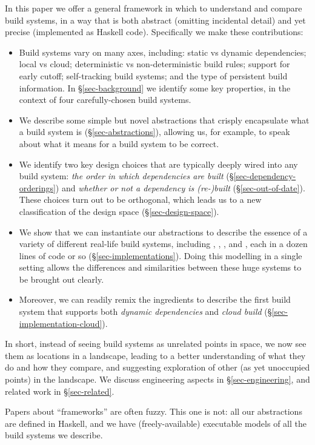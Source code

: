 In this paper we offer a general framework in which to understand
and compare build systems,
in a way that is both abstract (omitting incidental detail)
and yet precise (implemented as Haskell code).  Specifically we make
these contributions:
\begin{itemize}
\item Build systems vary on many axes, including:
static vs dynamic dependencies; local vs cloud; deterministic vs
non-deterministic build rules; support for early cutoff; self-tracking build
systems; and the type of persistent build information.
In \S\ref{sec-background} we identify some key properties, in the context of
four carefully-chosen build systems.
\item We describe some simple but novel abstractions that
  crisply encapsulate what a build system is (\S\ref{sec-abstractions}),
  allowing us, for example, to speak about what it means for a build system to be correct.

\item We identify two key design choices
  that are typically deeply wired into any build system:
  \emph{the order in which dependencies are built} (\S\ref{sec-dependency-orderings})
  and \emph{whether or not a dependency is (re-)built} (\S\ref{sec-out-of-date}).
  These choices turn out to be orthogonal, which leads us to a new
  classification of the design space (\S\ref{sec-design-space}).

\item We show that we can instantiate
our abstractions to describe the essence of a variety of different
real-life build systems, including \Make, \Shake, \Bazel, and \Excel, each in
a dozen lines of code or so (\S\ref{sec-implementations}).
Doing this modelling in a single setting allows
the differences and similarities between these huge systems to be
brought out clearly.

\item Moreover, we can readily remix the ingredients to describe the first
  build system that supports both \emph{dynamic dependencies}
  and \emph{cloud build} (\S\ref{sec-implementation-cloud}).

\end{itemize}
In short, instead of seeing build systems as unrelated
points in space, we now see them as locations in a landscape,
leading to a better understanding of what they do and how they compare,
and suggesting exploration of other (as yet unoccupied points) in the
landscape.
We discuss engineering aspects in \S\ref{sec-engineering}, and related
work in \S\ref{sec-related}.

Papers about ``frameworks'' are often fuzzy.  This one is not: all our
abstractions are defined in Haskell, and we have (freely-available)
executable models of all the build systems we describe.
